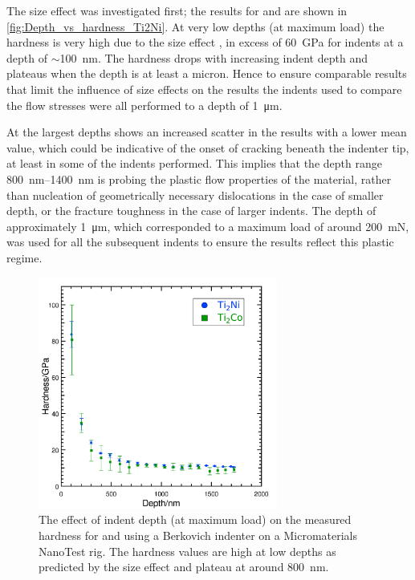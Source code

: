 The size effect was investigated first; the results for  and  are shown in \autoref{fig:Depth_vs_hardness_Ti2Ni}. At very low depths (at maximum load) the hardness is very high due to the size effect \cite{Cripps2011}, in excess of \SI{60}{\giga\pascal} for indents at a depth of $\sim$\SI{100}{\nano\meter}. The hardness drops with increasing indent depth and plateaus when the depth is at least a micron. Hence to ensure comparable results that limit the influence of size effects on the results the indents used to compare the flow stresses were all performed to a depth of \SI{1}{\micro\meter}. 

At the largest depths  shows an increased scatter in the results with a lower mean value, which could be indicative of the onset of cracking beneath the indenter tip, at least in some of the indents performed. This implies that the depth range \SIrange{800}{1400}{\nano\meter} is probing the plastic flow properties of the material, rather than nucleation of geometrically necessary dislocations in the case of smaller depth, or the fracture toughness in the case of larger indents. The depth of approximately \SI{1}{\micro\meter}, which corresponded to a maximum load of around \SI{200}{\milli\newton}, was used for all the subsequent indents to ensure the results reflect this plastic regime.


\begin{figure}[h!tb]
\centering
\includegraphics[width=0.7\textwidth]{Depth_vs_Hardness_Ti2Ni}
\captionsetup{width=0.8\textwidth}
\caption[The size effect on indentation in ]{The effect of indent depth (at maximum load) on the measured hardness for  and  using a Berkovich indenter on a Micromaterials NanoTest rig. The hardness values are high at low depths as predicted by the size effect \cite{Cripps2011} and plateau at around \SI{800}{\nano\meter}.\label{fig:Depth_vs_hardness_Ti2Ni}}
\end{figure}















